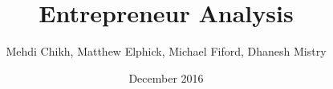 \geometry{margin=25mm}
\pagestyle{fancy}
\fancyhf{}
\cfoot{\thepage}

\title{Entrepreneur Analysis}
\author{Mehdi Chikh, Matthew Elphick, Michael Fiford, Dhanesh Mistry}
\date{December 2016}